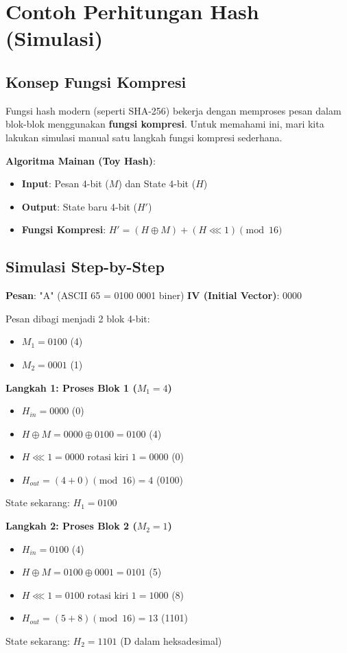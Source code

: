 \section{Contoh Perhitungan Hash (Simulasi)}

\subsection{Konsep Fungsi Kompresi}

Fungsi hash modern (seperti SHA-256) bekerja dengan memproses pesan dalam blok-blok menggunakan \textbf{fungsi kompresi}. Untuk memahami ini, mari kita lakukan simulasi manual satu langkah fungsi kompresi sederhana.

\textbf{Algoritma Mainan (Toy Hash)}:
\begin{itemize}
  \item \textbf{Input}: Pesan 4-bit ($M$) dan State 4-bit ($H$)
  \item \textbf{Output}: State baru 4-bit ($H'$)
  \item \textbf{Fungsi Kompresi}: $H' = (H \oplus M) + (H \lll 1) \pmod{16}$
\end{itemize}

\subsection{Simulasi Step-by-Step}

\textbf{Pesan}: "A" (ASCII 65 = 0100 0001 biner)
\textbf{IV (Initial Vector)}: 0000

Pesan dibagi menjadi 2 blok 4-bit:
\begin{itemize}
  \item $M_1 = 0100$ (4)
  \item $M_2 = 0001$ (1)
\end{itemize}

\textbf{Langkah 1: Proses Blok 1 ($M_1 = 4$)}
\begin{itemize}
  \item $H_{in} = 0000$ (0)
  \item $H \oplus M = 0000 \oplus 0100 = 0100$ (4)
  \item $H \lll 1 = 0000 \text{ rotasi kiri 1} = 0000$ (0)
  \item $H_{out} = (4 + 0) \pmod{16} = 4$ (0100)
\end{itemize}
State sekarang: $H_1 = 0100$

\textbf{Langkah 2: Proses Blok 2 ($M_2 = 1$)}
\begin{itemize}
  \item $H_{in} = 0100$ (4)
  \item $H \oplus M = 0100 \oplus 0001 = 0101$ (5)
  \item $H \lll 1 = 0100 \text{ rotasi kiri 1} = 1000$ (8)
  \item $H_{out} = (5 + 8) \pmod{16} = 13$ (1101)
\end{itemize}
State sekarang: $H_2 = 1101$ (D dalam heksadesimal)


